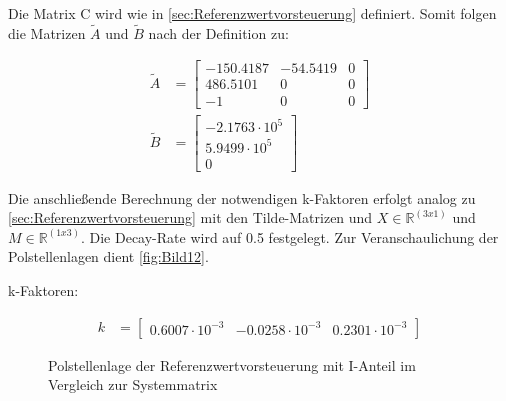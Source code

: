 Die Matrix C wird wie in \autoref{sec:Referenzwertvorsteuerung} definiert. Somit folgen die Matrizen $\tilde{A}$ und $\tilde{B}$ nach der Definition zu:

\begin{align*}
    \tilde{A} &=
    \begin{bmatrix}
        -150.4187 & -54.5419 & 0 \\
        486.5101 & 0 & 0 \\
        -1 & 0 & 0
    \end{bmatrix} \\
    \tilde{B} &=
    \begin{bmatrix}
        -2.1763\cdot 10^5 \\
        5.9499\cdot 10^5 \\
        0
    \end{bmatrix}
\end{align*}

Die anschließende Berechnung der notwendigen k-Faktoren erfolgt analog zu \autoref{sec:Referenzwertvorsteuerung} mit den Tilde-Matrizen und $X\in\mathbb{R}^{(3x1)}$ und $M\in\mathbb{R}^{(1x3)}$. Die Decay-Rate wird auf 0.5 festgelegt. Zur Veranschaulichung der Polstellenlagen dient \autoref{fig:Bild12}.\\
\newline

k-Faktoren:

\begin{align}
    k &=
    \begin{bmatrix}
        0.6007\cdot 10^{-3} & -0.0258\cdot 10^{-3} & 0.2301\cdot 10^{-3}
    \end{bmatrix}
\end{align}

\begin{figure}[H]
   \centering
   \caption[Polstellenlage der Referenzwertvorsteuerung mit I-Anteil]{Polstellenlage der Referenzwertvorsteuerung mit I-Anteil im Vergleich zur Systemmatrix}
   \label{fig:Bild12}
\end{figure}

